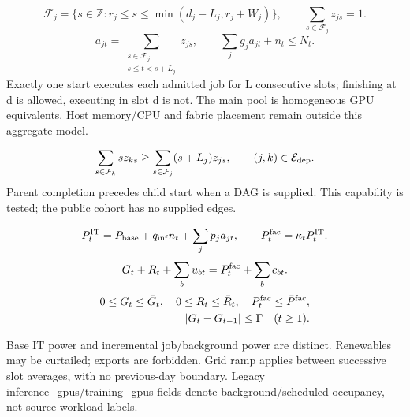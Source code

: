 \documentclass[10pt,a4paper]{article}
\begin{document}
\begin{equation}
\mathcal F_j=\{s\in\mathbb Z:r_j\le s\le\min(d_j-L_j,r_j+W_j)\},\qquad \sum_{s\in\mathcal F_j}z_{js}=1.
\end{equation}
\begin{equation}
a_{jt}=\sum_{\substack{s\in\mathcal F_j\\s\le t<s+L_j}}z_{js},\qquad\sum_jg_ja_{jt}+n_t\le N_t.
\end{equation}
Exactly one start executes each admitted job for L consecutive slots; finishing at d is allowed, executing in slot d is not. The main pool is homogeneous GPU equivalents. Host memory/CPU and fabric placement remain outside this aggregate model.

\begin{equation}
\sum_{s\in\mathcal F_k}s z_{ks}\ge\sum_{s\in\mathcal F_j}(s+L_j)z_{js},\qquad(j,k)\in\mathcal E_{\rm dep}.
\end{equation}
Parent completion precedes child start when a DAG is supplied. This capability is tested; the public cohort has no supplied edges.

\begin{equation}
P_t^{\rm IT}=P_{\rm base}+q_{\rm inf}n_t+\sum_jp_ja_{jt},\qquad P_t^{\rm fac}=\kappa_tP_t^{\rm IT}.
\end{equation}
\begin{equation}
G_t+R_t+\sum_bu_{bt}=P_t^{\rm fac}+\sum_bc_{bt}.
\end{equation}
\begin{equation}
\begin{aligned}0\le G_t\le\bar G_t,\quad 0\le R_t\le\bar R_t,\quad P_t^{\rm fac}\le\bar P^{\rm fac},\\ |G_t-G_{t-1}|\le\Gamma\quad(t\ge1).\end{aligned}
\end{equation}
{\small Base IT power and incremental job/background power are distinct. Renewables may be curtailed; exports are forbidden. Grid ramp applies between successive slot averages, with no previous-day boundary. Legacy inference\_gpus/training\_gpus fields denote background/scheduled occupancy, not source workload labels.\par}

\clearpage
\end{document}
